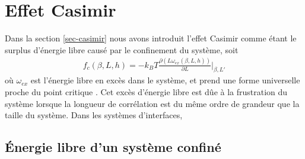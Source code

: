 \chapter{Effet Casimir}
    \label{chap-sos}

Dans la section \ref{sec-casimir} nous avons introduit l'effet Casimir comme étant le surplus d'énergie libre causé par le confinement du système, soit 
\begin{align}
    f_c(\beta,L,h) = - k_B T \frac{\partial(L \omega_{ex}(\beta,L,h))}{\partial L}\bigg|_{\beta,L'}
\end{align}
où $\omega_{ex}$ est l'énergie libre en excès dans le système, et prend une forme universelle proche du point critique \cite{casimir-universel}. Cet excès d'énergie libre est dûe à la frustration du système lorsque la longueur de corrélation est du même ordre de grandeur que la taille du système. Dans les systèmes d'interfaces, 
	
    \section{Énergie libre d'un système confiné}
	
